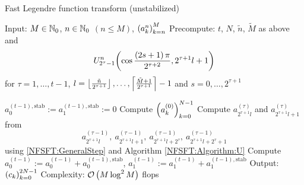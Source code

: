 \begin{algorithm}[tb]
  \caption{Fast Legendre function transform (unstabilized)}
  \label{NFSFT:Algorithm:FLFT_unstab}    
  \begin{algorithmic}
    \STATE Input:  $M \in \mathbb{N}_{0}$, $n \in \mathbb{N}_{0}$ $(n \le M)$, $\left(a_k^n\right)_{k=n}^{M}$
    \STATE Precompute: $t$, $N$, $\tilde{n}$, $\tilde{M}$ as above and \[U_{2^{\tau}-1}^{n}{\hspace{-0.4ex}}\left(\cos \frac{\left(2s+1\right)\pi}{2^{\tau+2}}, 2^{\tau+1}l+1\right)\] 
    \STATE {} for $\tau = 1,\ldots,t-1$, $l = \left\lfloor\frac{\tilde{n}}{2^{\tau+1}}\right\rfloor,\ldots,\left\lceil\frac{\tilde{M}+1}{2^{\tau+1}}\right\rceil-1$ and $s = 0,\ldots,2^{\tau+1}$
    \STATE {} 

    \STATE $a_{0}^{(t-1),\text{stab}} := a_{1}^{(t-1),\text{stab}} := 0$
    \STATE Compute $\left(a_{k}^{(0)}\right)_{k=0}^{N-1}$ 
        \STATE Compute $a_{2^{\tau+1}l}^{(\tau)}$ and $a_{2^{\tau+1}l+1}^{(\tau)}$ from \[a_{2^{\tau+1}l}^{(\tau-1)},\  
          a_{2^{\tau+1}l+1}^{(\tau-1)},\ a_{2^{\tau+1}l+2^{\tau}}^{(\tau-1)},\ a_{2^{\tau+1}l+2^{\tau}+1}^{(\tau-1)}\] using 
          \eqref{NFSFT:GeneralStep} and Algorithm \ref{NFSFT:Algorithm:U}
      \ENDFOR
    \ENDFOR
    \STATE Compute $a_{0}^{(t-1)} := a_{0}^{(t-1)} + a_{0}^{(t-1),\text{stab}}$, $a_{1}^{(t-1)} := a_{1}^{(t-1)} + a_{1}^{(t-1),\text{stab}}$
    \STATE Output: $\left(c_{k}\right)_{k=0}^{2N-1}$
    \STATE Complexity: $\mathcal{O}\left(M \log^2 M\right)$ flops
\end{algorithmic}
\end{algorithm}

